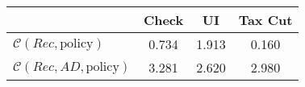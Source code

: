 \begin{tabular}{@{}lccc@{}} 
\toprule 
                          & Check      & UI    & Tax Cut    \\  \midrule 
$\mathcal{C}(Rec,\text{policy})$ & 0.734  & 1.913  & 0.160     \\ 
$\mathcal{C}(Rec, AD,\text{policy})$ & 3.281  & 2.620  & 2.980     \\ 
\end{tabular}  
